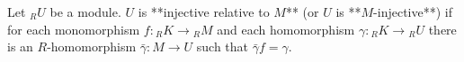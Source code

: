 Let ${}_R U$ be a module. $U$ is **injective relative to $M$** (or $U$ is **$M$-injective**) if for each monomorphism $f: {}_R K \to {}_R M$ and each homomorphism $\gamma: {}_R K \to {}_R U$ there is an $R$-homomorphism $\bar{\gamma}: M \to U$ such that $\bar{\gamma} f = \gamma$.
